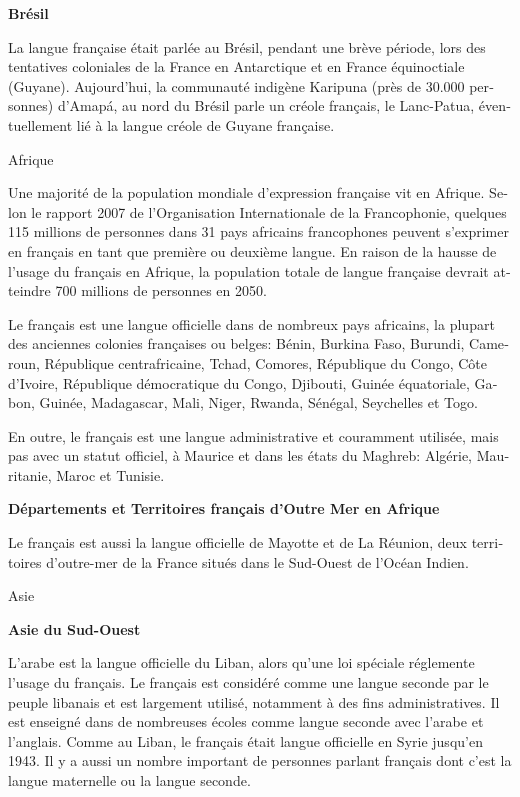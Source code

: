 \begin{french}
\begin{multicols}{2}
{\bf Brésil}

La langue française était parlée au Brésil, pendant une brève période,
lors des tentatives coloniales de la France en Antarctique et en
France équinoctiale (Guyane). Aujourd'hui, la communauté indigène
Karipuna (près de 30.000 personnes) d'Amapá, au nord du Brésil
parle un créole français, le Lanc-Patua, éventuellement lié à la
langue créole de Guyane française.

\vspace{1cm}
\begin{center}
{\sc Afrique}
\end{center}

Une majorité de la population mondiale d'expression française
vit en Afrique. Selon le rapport 2007 de l'Organisation
Internationale de la Francophonie, quelques 115 millions de personnes
dans 31 pays africains francophones peuvent s'exprimer en
français en tant que première ou deuxième langue. En raison de la
hausse de l'usage du français en Afrique, la population totale de langue
française devrait atteindre 700 millions de personnes en 2050.

Le français est une langue officielle dans de nombreux pays africains,
la plupart des anciennes colonies françaises ou belges: Bénin, Burkina
Faso, Burundi, Cameroun, République centrafricaine, Tchad, Comores,
République du Congo, Côte d'Ivoire, République démocratique du
Congo, Djibouti, Guinée équatoriale, Gabon, Guinée, Madagascar, Mali,
Niger, Rwanda, Sénégal, Seychelles et Togo.

En outre, le français est une langue administrative et couramment
utilisée, mais pas avec un statut officiel, à Maurice et dans les
états du Maghreb: Algérie, Mauritanie, Maroc et Tunisie.

{\bf Départements et Territoires français d'Outre Mer en Afrique}

Le français est aussi la langue officielle de Mayotte et de La
Réunion, deux territoires d'outre-mer de la France situés dans
le Sud-Ouest de l'Océan Indien.

\begin{center}
{\sc Asie}
\end{center}

{\bf Asie du Sud-Ouest}

L'arabe est la langue officielle du Liban, alors qu'une 
loi spéciale réglemente l'usage du français. Le
français est considéré comme une langue seconde par le peuple libanais
et est largement utilisé, notamment à des fins administratives. Il est
enseigné dans de nombreuses écoles comme langue seconde avec l'arabe et l'anglais. Comme au Liban, le français était
langue officielle en Syrie jusqu'en 1943. Il y a aussi un
nombre important de personnes parlant français dont c'est la
langue maternelle ou la langue seconde.


\end{multicols}
\end{french}
